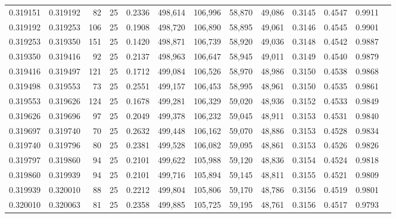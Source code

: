 \begin{tabular}{rrrrrrrrrrrrr}
0.319151 & 0.319192 &    82 &  25 &                                     0.2336 & 498,614 & 106,996 &  58,870 &  49,086 & 0.3145 & 0.4547 & 0.9911 \\
0.319192 & 0.319253 &   106 &  25 &                                     0.1908 & 498,720 & 106,890 &  58,895 &  49,061 & 0.3146 & 0.4545 & 0.9901 \\
0.319253 & 0.319350 &   151 &  25 &                                     0.1420 & 498,871 & 106,739 &  58,920 &  49,036 & 0.3148 & 0.4542 & 0.9887 \\
0.319350 & 0.319416 &    92 &  25 &                                     0.2137 & 498,963 & 106,647 &  58,945 &  49,011 & 0.3149 & 0.4540 & 0.9879 \\
0.319416 & 0.319497 &   121 &  25 &                                     0.1712 & 499,084 & 106,526 &  58,970 &  48,986 & 0.3150 & 0.4538 & 0.9868 \\
0.319498 & 0.319553 &    73 &  25 &                                     0.2551 & 499,157 & 106,453 &  58,995 &  48,961 & 0.3150 & 0.4535 & 0.9861 \\
0.319553 & 0.319626 &   124 &  25 &                                     0.1678 & 499,281 & 106,329 &  59,020 &  48,936 & 0.3152 & 0.4533 & 0.9849 \\
0.319626 & 0.319696 &    97 &  25 &                                     0.2049 & 499,378 & 106,232 &  59,045 &  48,911 & 0.3153 & 0.4531 & 0.9840 \\
0.319697 & 0.319740 &    70 &  25 &                                     0.2632 & 499,448 & 106,162 &  59,070 &  48,886 & 0.3153 & 0.4528 & 0.9834 \\
0.319740 & 0.319796 &    80 &  25 &                                     0.2381 & 499,528 & 106,082 &  59,095 &  48,861 & 0.3153 & 0.4526 & 0.9826 \\
0.319797 & 0.319860 &    94 &  25 &                                     0.2101 & 499,622 & 105,988 &  59,120 &  48,836 & 0.3154 & 0.4524 & 0.9818 \\
0.319860 & 0.319939 &    94 &  25 &                                     0.2101 & 499,716 & 105,894 &  59,145 &  48,811 & 0.3155 & 0.4521 & 0.9809 \\
0.319939 & 0.320010 &    88 &  25 &                                     0.2212 & 499,804 & 105,806 &  59,170 &  48,786 & 0.3156 & 0.4519 & 0.9801 \\
0.320010 & 0.320063 &    81 &  25 &                                     0.2358 & 499,885 & 105,725 &  59,195 &  48,761 & 0.3156 & 0.4517 & 0.9793 \\

\end{tabular}
